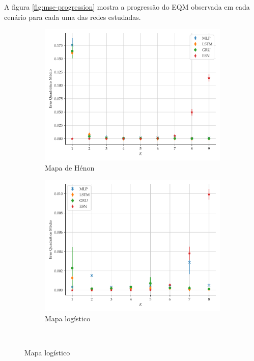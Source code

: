 \documentclass[a4paper, 12pt]{article}
\begin{document}
A figura \ref{fig:mse-progression} mostra a progressão do EQM observada em cada cenário para cada uma das redes estudadas. 
\begin{figure}[!ht]
     \begin{subfigure}[t]{0.45\textwidth} 
         \includegraphics[scale=0.4]{progressao-k-henon.pdf}
         \caption{Mapa de Hénon}
     \end{subfigure}
     \centering
     \begin{subfigure}[t]{0.45\textwidth} 
         \includegraphics[scale=0.4]{progressao-k-logistic.pdf}
         \caption{Mapa logístico}
     \end{subfigure}
     \\
     \centering

\end{figure}
\end{document}

